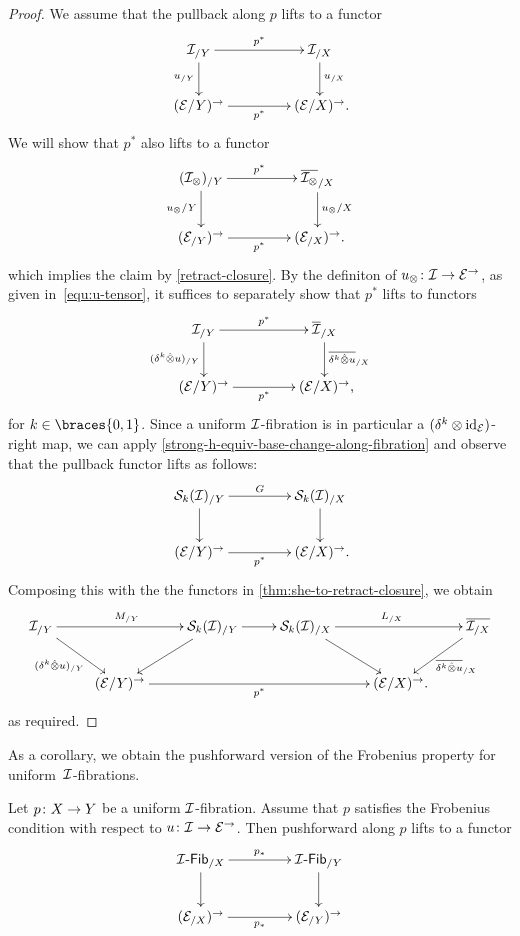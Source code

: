\documentclass[reqno,10pt,a4paper,oneside]{amsart}
\begin{document}
\begin{proof}
We assume that the pullback along $p$ lifts to a functor
\[
\xymatrix@C+2em{
  \cal{I}_{/Y}
  \ar[r]^{p^*}
  \ar[d]_{u_{/Y}}
&
  \cal{I}_{/X}
  \ar[d]^{u_{/X}}
\\
  (\catE / Y)^\to
  \ar[r]_{p^*}
&
  (\catE / X)^\to \rlap{.}
}
\]
We will show that $p^*$ also lifts to a functor
\[
\xymatrix@C+2em{
  (\cal{I}_\otimes)_{/Y} \ar[r]^{p^*} \ar[d]_{u_{\otimes}/Y} & \overline{\cal{I}_\otimes}_{/X} \ar[d]^{u_{\otimes}/X} \\
  (\cal{E}_{/Y})^\to \ar[r]_{p^*} & (\cal{E}_{/X})^\to \rlap{.}
}
\]
which implies the claim by \cref{retract-closure}.
By the definiton of $u_\otimes \co \cal{I} \to \catE^\to$, as given in~\eqref{equ:u-tensor}, it suffices to separately show that $p^*$ lifts to functors
\[
\xymatrix@C+2em{
  \cal{I}_{/Y}
  \ar[r]^{p^*}
  \ar[d]_{(\kcyl \hatotimes u)_{/Y}}
&
  \overline{\cal{I}}_{/X}
  \ar[d]^{ \overline{\kcyl \hatotimes u}_{/X}}
\\
  (\catE / Y)^\to
  \ar[r]_{p^*}
&
  (\catE / X)^\to \rlap{,}
}
\]
for $k \in \braces{0, 1}$.
Since a uniform $\cal{I}$-fibration is in particular a $(\kcyl \otimes \id_\catE)$-right map, we can apply \cref{strong-h-equiv-base-change-along-fibration} and observe that the pullback functor lifts as follows:
\[
\xymatrix@C+2em{
  \cal{S}_k(\cal{I})_{/Y}
  \ar[r]^{G}
  \ar[d]
&
  \cal{S}_k(\cal{I})_{/X}
  \ar[d] \\
  (\catE / Y)^\to
  \ar[r]_{p^*}
&
  (\catE / X)^\to \rlap{.}
}
\]
Composing this with the the functors in \cref{thm:she-to-retract-closure}, we obtain
\[
\xymatrix{
  \cal{I}_{/Y}
  \ar[rr]^{M_{/Y}}
  \ar[dr]_{(\kcyl \hatotimes u)_{/Y}} &
&
  \cal{S}_k(\cal{I})_{/Y}
  \ar[r]
  \ar[dl]
&
  \cal{S}_k(\cal{I})_{/X}
  \ar[rr]^{L_{/X}}
  \ar[dr]
& &
  \overline{\cal{I}_{/X}}
  \ar[dl]^{\overline{\kcyl \hatotimes u}_{/X}}
\\ &
  (\catE/Y)^\to
  \ar[rrr]_{p^*}
&&&
  (\catE/X)^\to \rlap{.}
}
\]
as required.
\end{proof}

As a corollary, we obtain the pushforward version of the Frobenius property for uniform~$\cal{I}$-fibrations.

\begin{corollary} \label{thm:frobenius-pushforward}
Let $p \co X \to Y$ be a uniform $\cal{I}$-fibration.
Assume that $p$ satisfies the Frobenius condition with respect to $u \co \cal{I} \to \cal{E}^\to$.
Then pushforward along $p$ lifts to a functor
\[
\xymatrix@C+2em{
  \Fib{\cal{I}}_{/X} \ar[r]^{p_*} \ar[d] & \Fib{\cal{I}}_{/Y} \ar[d] \\
  (\cal{E}_{/X})^\to \ar[r]_{p_*} & (\cal{E}_{/Y})^\to
}
\]
\end{corollary}
\end{document}
